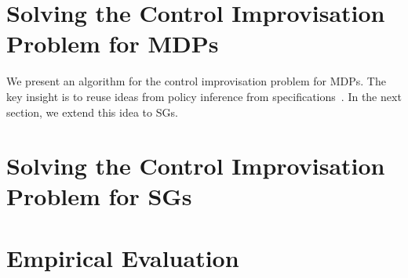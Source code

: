 \documentclass[runningheads]{llncs}
\begin{document}
\section{Solving the Control Improvisation Problem for MDPs}
We present an algorithm for the control improvisation problem for MDPs. The key insight is to reuse ideas from policy inference from specifications~\cite{}. In the next section, we extend this idea to SGs.

\section{Solving the Control Improvisation Problem for SGs}

\section{Empirical Evaluation}
\end{document}
